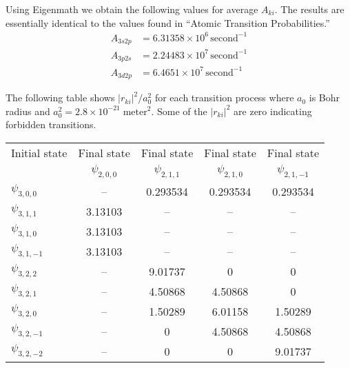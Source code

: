 Using Eigenmath we obtain the following values for average $A_{ki}$.
The results are essentially identical to the values found in ``Atomic Transition Probabilities.''
\begin{align*}
A_{3s2p}&=6.31358\times10^6\,\text{second}^{-1}
\\
A_{3p2s}&=2.24483\times10^7\,\text{second}^{-1}
\\
A_{3d2p}&=6.4651\times10^7\,\text{second}^{-1}
\end{align*}



The following table shows $|r_{ki}|^2/a_0^2$ for each transition process
where $a_0$ is Bohr radius and $a_0^2=2.8\times10^{-21}\;\text{meter}^2$.
Some of the $|r_{ki}|^2$ are zero indicating forbidden transitions.

\begin{center}
\begin{tabular}{|l|c|c|c|c|}
\hline
Initial state & Final state & Final state & Final state & Final state
\\
& $\psi_{2,0,0}$ & $\psi_{2,1,1}$ & $\psi_{2,1,0}$ & $\psi_{2,1,-1}$
\\[1ex]
\hline
$\psi_{3,0,0}$ & -- & 0.293534 & 0.293534 & 0.293534
\\
\hline
$\psi_{3,1,1}$ & 3.13103 & -- & -- & --
\\
$\psi_{3,1,0}$ & 3.13103 & -- & -- & --
\\
$\psi_{3,1,-1}$ & 3.13103 & -- & -- & --
\\
\hline
$\psi_{3,2,2}$ & -- & 9.01737 & 0 & 0
\\
$\psi_{3,2,1}$ & -- & 4.50868 & 4.50868 & 0
\\
$\psi_{3,2,0}$ & -- & 1.50289 & 6.01158 & 1.50289
\\
$\psi_{3,2,-1}$ & -- & 0 & 4.50868 & 4.50868
\\
$\psi_{3,2,-2}$ & -- & 0 & 0 & 9.01737
\\
\hline
\end{tabular}
\end{center}


